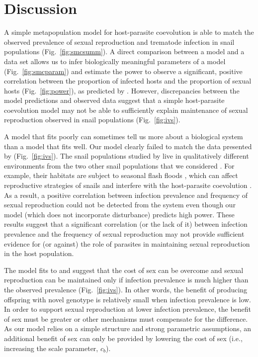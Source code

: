 \documentclass{article}\usepackage[]{graphicx}\usepackage[]{color}
\newcommand{\fref}[1]{Fig.~\ref{fig:#1}}
\begin{document}
\section{Discussion}

A simple metapopulation model for host-parasite coevolution is able to match the observed prevalence of sexual reproduction and trematode infection in snail populations (\fref{smcsumm}).
A direct comparison between a model and a data set allows us to infer biologically meaningful parameters of a model (\fref{smcparam}) and estimate the power to observe a significant, positive correlation between the proportion of infected hosts and the proportion of sexual hosts (\fref{power}), as predicted by \cite{lively1992parthenogenesis}.
However, discrepancies between the model predictions and observed data suggest that a simple host-parasite coevolution model may not be able to sufficiently explain maintenance of sexual reproduction observed in snail populations (\fref{ivs}).

A model that fits poorly can sometimes tell us more about a biological system than a model that fits well.
Our model clearly failed to match the data presented by \cite{dagan2013clonal} (\fref{ivs}).
The snail populations studied by \cite{dagan2013clonal} live in qualitatively different environments from the two other snail populations that we considered \citep{vergara2014infection, mckone2016fine}.
For example, their habitats are subject to seasonal flash floods \citep{ben2007temporal}, which can affect reproductive strategies of snails and interfere with the host-parasite coevolution \citep{lytle2000biotic, ben2007temporal}.
As a result, a positive correlation between infection prevalence and frequency of sexual reproduction could not be detected from the system even though our model (which does not incorporate disturbance) predicts high power.
These results suggest that a significant correlation (or the lack of it) between infection prevalence and the frequency of sexual reproduction may not provide sufficient evidence for (or against) the role of parasites in maintaining sexual reproduction in the host population.

The model fits to \cite{dagan2013clonal} and \cite{mckone2016fine} suggest that the cost of sex can be overcome and sexual reproduction can be maintained only if infection prevalence is much higher than the observed prevalence (\fref{ivs}).
In other words, the benefit of producing offspring with novel genotype is relatively small when infection prevalence is low.
In order to support sexual reproduction at lower infection prevalence, the benefit of sex must be greater or other mechanisms must compensate for the difference.
As our model relies on a simple structure and strong parametric assumptions, an additional benefit of sex can only be provided by lowering the cost of sex (i.e., increasing the scale parameter, $c_b$).
\end{document}
